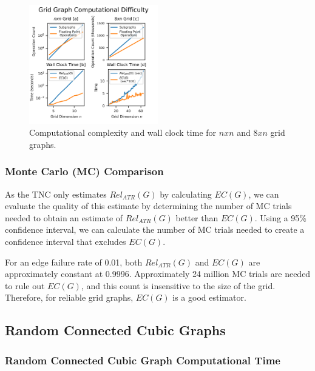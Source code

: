 \begin{figure}[t]
\caption{Computational complexity and wall clock time for $nxn$ and $8xn$ grid graphs.}
\label{fig:Grid Graph Computational Time}
\includegraphics[width=0.5\textwidth]{../figures/GridGraphComputeTime8.png}
\end{figure}

\hypertarget{monte-carlo-mc-comparison}{%
\subsubsection{Monte Carlo (MC) Comparison}\label{monte-carlo-mc-comparison}}

As the TNC only estimates \(Rel_{ATR}(G)\) by calculating \(EC(G)\), we can evaluate the quality of this estimate by determining the number of MC trials needed to obtain an estimate of \(Rel_{ATR}(G)\) better than \(EC(G)\). Using a 95\% confidence interval, we can calculate the number of MC trials needed to create a confidence interval that excludes \(EC(G)\).

For an edge failure rate of 0.01, both \(Rel_{ATR}(G)\) and \(EC(G)\) are approximately constant at 0.9996. Approximately 24 million MC trials are needed to rule out \(EC(G)\), and this count is insensitive to the size of the grid. Therefore, for reliable grid graphs, \(EC(G)\) is a good estimator.

\hypertarget{random-connected-cubic-graphs}{%
\subsection{Random Connected Cubic Graphs}\label{random-connected-cubic-graphs}}

\hypertarget{random-connected-cubic-graph-computational-time}{%
\subsubsection{Random Connected Cubic Graph Computational Time}\label{random-connected-cubic-graph-computational-time}}

